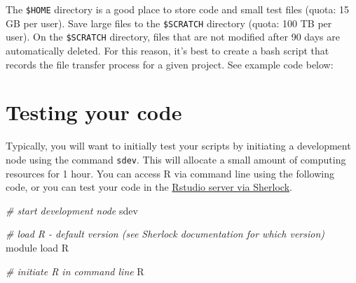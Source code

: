 \documentclass[
]{book}
\newenvironment{Shaded}{\begin{snugshade}}{\end{snugshade}}
\newcommand{\AttributeTok}[1]{\textcolor[rgb]{0.77,0.63,0.00}{#1}}
\newcommand{\BuiltInTok}[1]{#1}
\newcommand{\CommentTok}[1]{\textcolor[rgb]{0.56,0.35,0.01}{\textit{#1}}}
\newcommand{\ExtensionTok}[1]{#1}
\newcommand{\FunctionTok}[1]{\textcolor[rgb]{0.00,0.00,0.00}{#1}}
\newcommand{\NormalTok}[1]{#1}
\newcommand{\StringTok}[1]{\textcolor[rgb]{0.31,0.60,0.02}{#1}}
\newcommand{\VariableTok}[1]{\textcolor[rgb]{0.00,0.00,0.00}{#1}}
\begin{document}
The \texttt{\$HOME} directory is a good place to store code and small test files (quota: 15 GB per user). Save large files to the \texttt{\$SCRATCH} directory (quota: 100 TB per user). On the \texttt{\$SCRATCH} directory, files that are not modified after 90 days are automatically deleted. For this reason, it's best to create a bash script that records the file transfer process for a given project. See example code below:

\begin{Shaded}
\end{Shaded}

\hypertarget{testing-your-code}{%
\section{Testing your code}\label{testing-your-code}}

Typically, you will want to initially test your scripts by initiating a development node using the command \texttt{sdev}. This will allocate a small amount of computing resources for 1 hour. You can access R via command line using the following code, or you can test your code in the \href{https://www.sherlock.stanford.edu/docs/user-guide/ondemand/\#rstudio}{Rstudio server via Sherlock}.

\begin{Shaded}
\begin{Highlighting}[]
\CommentTok{\# start development node}
\ExtensionTok{sdev}

\CommentTok{\# load R {-} default version (see Sherlock documentation for which version)}
\ExtensionTok{module}\NormalTok{ load R}

\CommentTok{\# initiate R in command line}
\ExtensionTok{R}
\end{Highlighting}
\end{Shaded}
\end{document}
